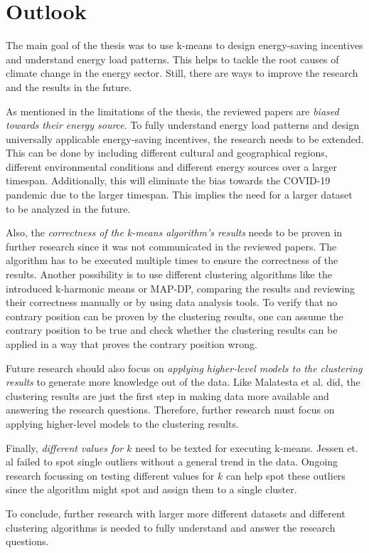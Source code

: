 
\section{Outlook}
\label{sec:outlook}
The main goal of the thesis was to use k-means to design energy-saving incentives and understand energy load patterns.
This helps to tackle the root causes of climate change in the energy sector.
Still, there are ways to improve the research and the results in the future.

As mentioned in the limitations of the thesis, the reviewed papers are \textit{biased towards their energy source}.
To fully understand energy load patterns and design universally applicable energy-saving incentives, the research needs to be extended.
This can be done by including different cultural and geographical regions, different environmental conditions and different energy sources over a larger timespan.
Additionally, this will eliminate the bias towards the COVID-19 pandemic due to the larger timespan.
This implies the need for a larger dataset to be analyzed in the future.

Also, the \textit{correctness of the k-means algorithm's results} needs to be proven in further research since it was not communicated in the reviewed papers.
The algorithm has to be executed multiple times to ensure the correctness of the results.
Another possibility is to use different clustering algorithms like the introduced k-harmonic means or MAP-DP, comparing the results and reviewing their correctness manually or by using data analysis tools.
To verify that no contrary position can be proven by the clustering results, one can assume the contrary position to be true and check whether the clustering results can be applied in a way that proves the contrary position wrong.

Future research should also focus on \textit{applying higher-level models to the clustering results} to generate more knowledge out of the data.
Like Malatesta et al. \cite{MAL-HBP} did, the clustering results are just the first step in making data more available and answering the research questions.
Therefore, further research must focus on applying higher-level models to the clustering results.

Finally, \textit{different values for $k$} need to be texted for executing k-means.
Jessen et. al \cite{JES-IND} failed to spot single outliers without a general trend in the data.
Ongoing research focussing on testing different values for $k$ can help spot these outliers since the algorithm might spot and assign them to a single cluster.

To conclude, further research with larger more different datasets and different clustering algorithms is needed to fully understand and answer the research questions.